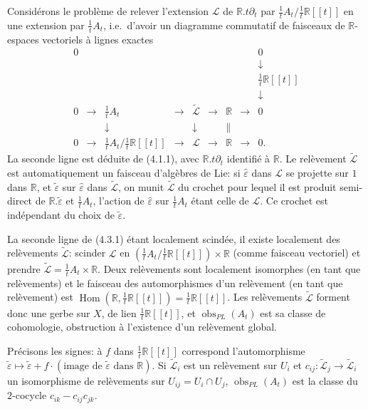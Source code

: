\documentclass[11pt,a4paper]{article}
\theoremstyle{plain}
\theoremstyle{definition}
\DeclareMathOperator{\Hom}{Hom}
\DeclareMathOperator{\obs}{obs}
\newcommand{\R}{\mathbb{R}}
\begin{document}
Consid\'erons le probl\`eme de relever l'extension $\mathcal{L}$ de $\R.t\partial_{t}$ par $\tfrac{1}{t}A_{t}/\tfrac{1}{t}\R[[t]]$ en une extension par $\tfrac{1}{t}A_{t}$, i.e.\ d'avoir un diagramme commutatif de faisceaux de $\R$-espaces vectoriels \`a lignes exactes
\[
\begin{array}{ccccccccc}
0 & & & & & & & & 0 \\
& & & & & & & & \downarrow \\
& & & & & & & & \tfrac{1}{t}\R[[t]] \\
& & & & & & & & \downarrow \\
0 & \longrightarrow & \tfrac{1}{t}A_{t} & \longrightarrow & \widetilde{\mathcal{L}} & \longrightarrow & \R & \longrightarrow & 0 \\
& & \downarrow & & \downarrow & & \| & & \\
0 & \longrightarrow & \tfrac{1}{t}A_{t}/\tfrac{1}{t}\R[[t]] & \longrightarrow & \mathcal{L} & \longrightarrow & \R & \longrightarrow & 0.
\end{array} \tag{4.3.1}
\]
La seconde ligne est d\'eduite de (4.1.1), avec $\R.t\partial_{t}$ identifi\'e \`a $\R$. Le rel\`evement $\widetilde{\mathcal{L}}$ est automatiquement un faisceau d'alg\`ebres de Lie: si $\hat{\varepsilon}$ dans $\mathcal{L}$ se projette sur $1$ dans $\R$, et $\tilde{\varepsilon}$ sur $\hat{\varepsilon}$ dans $\widetilde{\mathcal{L}}$, on munit $\widetilde{\mathcal{L}}$ du crochet pour lequel il est produit semi-direct de $\R.\tilde{\varepsilon}$ et $\tfrac{1}{t}A_{t}$, l'action de $\hat{\varepsilon}$ sur $\tfrac{1}{t}A_{t}$ \'etant celle de $\mathcal{L}$. Ce crochet est ind\'ependant du choix de $\tilde{\varepsilon}$.

La seconde ligne de (4.3.1) \'etant localement scind\'ee, il existe localement
des rel\`evements $\widetilde{\mathcal{L}}$: scinder $\mathcal{L}$ en $(\tfrac{1}{t}A_{t}/\tfrac{1}{t}\R[[t]]) \times \R$ (comme faisceau vectoriel) et
prendre $\widetilde{\mathcal{L}} = \tfrac{1}{t}A_{t} \times \R$. Deux rel\`evements sont localement isomorphes (en tant
que rel\`evements) et le faisceau des automorphismes d'un rel\`evement (en tant que
rel\`evement) est $\Hom(\R, \tfrac{1}{t}\R[[t]]) = \tfrac{1}{t}\R[[t]]$. Les rel\`evements $\widetilde{\mathcal{L}}$ forment donc une gerbe
sur $X$, de lien $\tfrac{1}{t}\R[[t]]$, et $\obs_{PL}(A_{t})$ est sa classe de cohomologie, obstruction \`a l'existence d'un rel\`evement global.

Pr\'ecisons les signes: \`a $f$ dans $\tfrac{1}{t}\R[[t]]$ correspond l'automorphisme $\tilde{\varepsilon} \mapsto \tilde{\varepsilon} + f \cdot (\text{image de } \tilde{\varepsilon} \text{ dans } \R)$. Si $\widetilde{\mathcal{L}}_{i}$ est un rel\`evement sur $U_{i}$ et $c_{ij}: \widetilde{\mathcal{L}}_{j} \to \widetilde{\mathcal{L}}_{i}$ un isomorphisme de rel\`evements sur $U_{ij} = U_{i} \cap U_{j}$, $\obs_{PL}(A_{t})$ est la classe du $2$-cocycle $c_{ik} - c_{ij} c_{jk}$.
\end{document}
